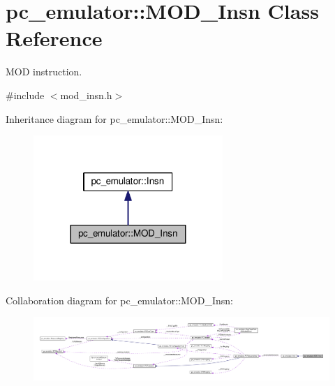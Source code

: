 \hypertarget{classpc__emulator_1_1MOD__Insn}{}\section{pc\+\_\+emulator\+:\+:M\+O\+D\+\_\+\+Insn Class Reference}
\label{classpc__emulator_1_1MOD__Insn}


M\+OD instruction.  




{\ttfamily \#include $<$mod\+\_\+insn.\+h$>$}



Inheritance diagram for pc\+\_\+emulator\+:\+:M\+O\+D\+\_\+\+Insn\+:\nopagebreak
\begin{figure}[H]
\begin{center}
\leavevmode
\includegraphics[width=203pt]{classpc__emulator_1_1MOD__Insn__inherit__graph}
\end{center}
\end{figure}


Collaboration diagram for pc\+\_\+emulator\+:\+:M\+O\+D\+\_\+\+Insn\+:\nopagebreak
\begin{figure}[H]
\begin{center}
\leavevmode
\includegraphics[width=350pt]{classpc__emulator_1_1MOD__Insn__coll__graph}
\end{center}
\end{figure}
